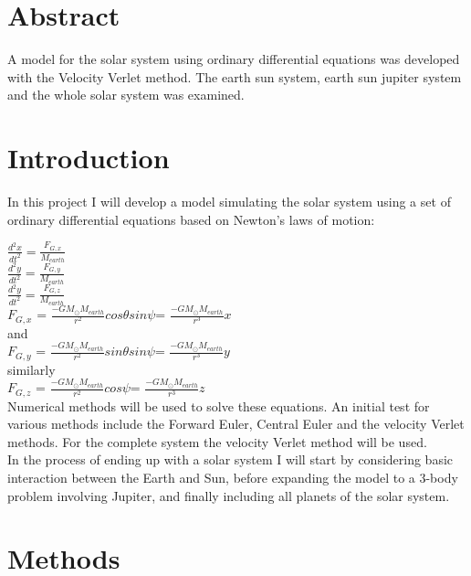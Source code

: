 \section{Abstract}
A model for the solar system using ordinary differential equations was developed with the Velocity Verlet method. The earth sun system, earth sun jupiter system and the whole solar system was examined.


\section{Introduction}
In this project I will develop a model simulating the solar system using a set of ordinary differential equations based on Newton's laws of motion:

$\frac{d^2x}{dt^2} = \frac{F_{G,x}}{M_{earth}}$\\

$\frac{d^2y}{dt^2} = \frac{F_{G,y}}{M_{earth}}$\\

$\frac{d^2y}{dt^2} = \frac{F_{G,z}}{M_{earth}}$\\

$F_{G,x}$ = $\frac{-GM_{\odot}M_{earth}}{r^2}cos\theta sin\psi$= $\frac{-GM_{\odot}M_{earth}}{r^3}x$\\

and\\

$F_{G,y}$ = $\frac{-GM_{\odot}M_{earth}}{r^2}sin\theta sin\psi$= $\frac{-GM_{\odot}M_{earth}}{r^3}y$\\

similarly\\

$F_{G,z}$ = $\frac{-GM_{\odot}M_{earth}}{r^2}cos\psi$= $\frac{-GM_{\odot}M_{earth}}{r^3}z$\\


Numerical methods will be used to solve these equations. An initial test for various methods include the Forward Euler, Central Euler and the velocity Verlet methods. For the complete system the velocity Verlet method will be used.\\


In the process of ending up with a solar system I will start by considering basic interaction between the Earth and Sun, before expanding the model to a 3-body problem involving Jupiter, and finally including all planets of the solar system. 





\section{Methods}
